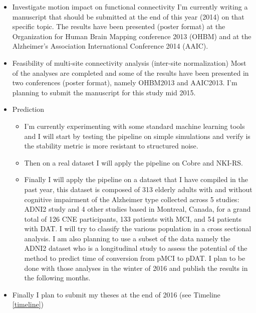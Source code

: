 \begin{itemize}
\item Investigate motion impact on functional connectivity
I'm currently writing a manuscript that should be submitted at the end of this year (2014) on that specific topic. The results have been presented (poster format) at the Organization for Human Brain Mapping conference 2013 (OHBM) and at the Alzheimer's Association International Conference 2014 (AAIC).

\item Feasibility of multi-site connectivity analysis (inter-site normalization)
Most of the analyses are completed and some of the results have been presented in two conferences (poster format), namely OHBM2013 and AAIC2013. I'm planning to submit the manuscript for this study mid 2015.

\item Prediction 
\begin{itemize}
\item I'm currently experimenting with some standard machine learning tools and I will start by testing the pipeline on simple simulations and verify is the stability metric is more resistant to structured noise.
\item  Then on a real dataset I will apply the pipeline on Cobre and NKI-RS.
\item Finally I will apply the pipeline on a dataset that I have compiled in the past year, this dataset is composed of 313 elderly adults with and without cognitive impairment of the Alzheimer type collected across 5 studies: ADNI2 study and 4 other studies based in Montreal, Canada, for a 
grand total of 126 CNE participants, 133 patients with MCI, and 54 patients with DAT. I will try to classify the various population in a cross sectional analysis. I am also planning to use a subset of the data namely the ADNI2 dataset who is a longitudinal study to assess the potential of the method to predict time of conversion from pMCI to pDAT. I plan to be done with those analyses in the winter of 2016 and publish the results in the following months.

\end{itemize}

\item Finally I plan to submit my theses at the end of 2016 (see Timeline \ref{timeline})

\end{itemize}

